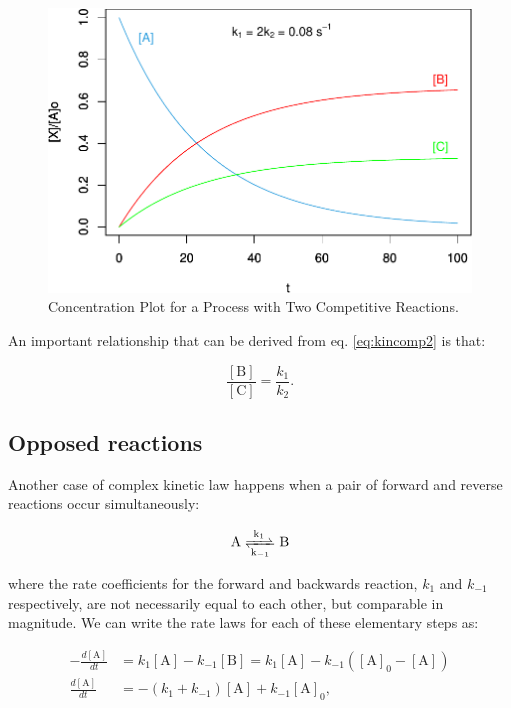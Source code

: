 \documentclass[
  9pt,
]{extbook}
\theoremstyle{definition}
\theoremstyle{definition}
\theoremstyle{definition}
\theoremstyle{definition}
\theoremstyle{remark}
\begin{document}
\begin{figure}

{\centering \includegraphics{pchem1_files/figure-latex/figk7-1} 

}

\caption{Concentration Plot for a Process with Two Competitive Reactions.}\label{fig:figk7}
\end{figure}

An important relationship that can be derived from eq. \eqref{eq:kincomp2} is that:

\begin{equation}
\frac{[\mathrm{B}]}{[\mathrm{C}]} =\frac{k_1}{k_2}.
\label{eq:kincomp5b}
\end{equation}

\subsection{Opposed reactions}\label{opposed-reactions}

Another case of complex kinetic law happens when a pair of forward and reverse reactions occur simultaneously:

\begin{equation}
\mathrm{A}\ce{<=>[k_1][k_{-1}]}\mathrm{B}
\end{equation}

where the rate coefficients for the forward and backwards reaction, \(k_1\) and \(k_{-1}\) respectively, are not necessarily equal to each other, but comparable in magnitude. We can write the rate laws for each of these elementary steps as:

\begin{equation}
\begin{aligned}
-\frac{d[\mathrm{A}]}{dt} &=k_1 [\mathrm{A}]-k_{-1} [\mathrm{B}] = k_1 [\mathrm{A}]-k_{-1}\left([\mathrm{A}]_0-[\mathrm{A}]\right) \\
\frac{d[\mathrm{A}]}{dt} &=-(k_1+k_{-1})[\mathrm{A}] + k_{-1}[\mathrm{A}]_0,
\end{aligned}
\label{eq:kinopp1}
\end{equation}
\end{document}

